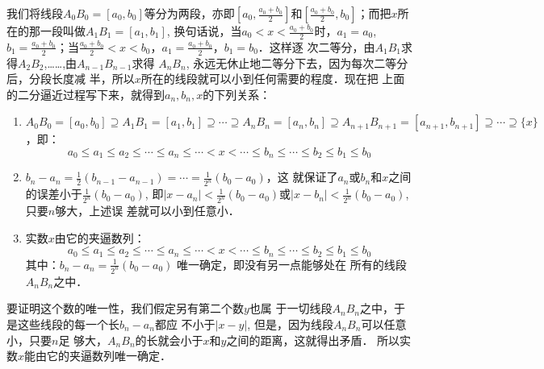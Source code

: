 \begin{figure}[htp]
    \centering
{}   
    \caption{}
\end{figure}

我们将线段$A_0B_0=[a_0,b_0]$等分为两段，亦即$\left[a_0,\frac{a_0+b_0}{2}\right]$和$\left[\frac{a_0+b_0}{2},b_0\right]$；而把$x$所在的那一段叫做$A_1B_1=[a_1,b_1]$, 换句话说，当$a_0<x<\frac{a_0+b_0}{2}$时，$a_1=a_0$, $b_1=\frac{a_0+b_0}{2}$；当$\frac{a_0+b_0}{2}<x<b_0$，$a_1=\frac{a_0+b_0}{2}$，$b_1=b_0$．这样逐
次二等分，由$A_1B_1$求得$A_2B_2$,……,由$A_{n-1}B_{n-1}$求得 $A_nB_n$,
永远无休止地二等分下去，因为每次二等分后，分段长度减
半，所以$x$所在的线段就可以小到任何需要的程度．现在把
上面的二分逼近过程写下来，就得到$a_n,b_n,x$的下列关系：
\begin{enumerate}
    \item $A_0B_0=[a_0, b_0]\supseteq A_1B_1 =[a_1,b_1]
    \supseteq \cdots \supseteq A_nB_n=[a_n, b_n]\supseteq A_{n+1}B_{n+1}=[a_{n+1},b_{n+1}]\supseteq \cdots \supseteq \{x\}$，即：
\[a_0\le a_1\le a_2\le\cdots\le a_n\le \cdots <x<\cdots\le b_n\le\cdots\le b_2\le b_1\le b_0\]

\item $b_n-a_n=\frac{1}{2}(b_{n-1}-a_{n-1})=\cdots=\frac{1}{2^n}(b_0-a_0)$，这
就保证了$a_n$或$b_n$和$x$之间的误差小于$\frac{1}{2^n}(b_0-a_0)$, 即$|x-a_n|<\frac{1}{2^n}(b_0-a_0)$或$|x-b_n|<\frac{1}{2^n}(b_0-a_0)$, 只要$n$够大，上述误
差就可以小到任意小．
\item 实数$x$由它的夹逼数列：
\[a_0\le a_1\le a_2\le\cdots\le a_n\le \cdots <x<\cdots\le b_n\le\cdots\le b_2\le b_1\le b_0\]
其中：$b_n-a_n=\frac{1}{2^n}(b_0-a_0)$
唯一确定，即没有另一点能够处在
所有的线段$A_nB_n$之中．
\end{enumerate}

要证明这个数的唯一性，我们假定另有第二个数$y$也属
于一切线段$A_nB_n$之中，于是这些线段的每一个长$b_n-a_n$都应
不小于$|x-y|$, 但是，因为线段$A_nB_n$可以任意小，只要$n$足
够大，$A_nB_n$的长就会小于$x$和$y$之间的距离，这就得出矛盾．
所以实数$x$能由它的夹逼数列唯一确定．

